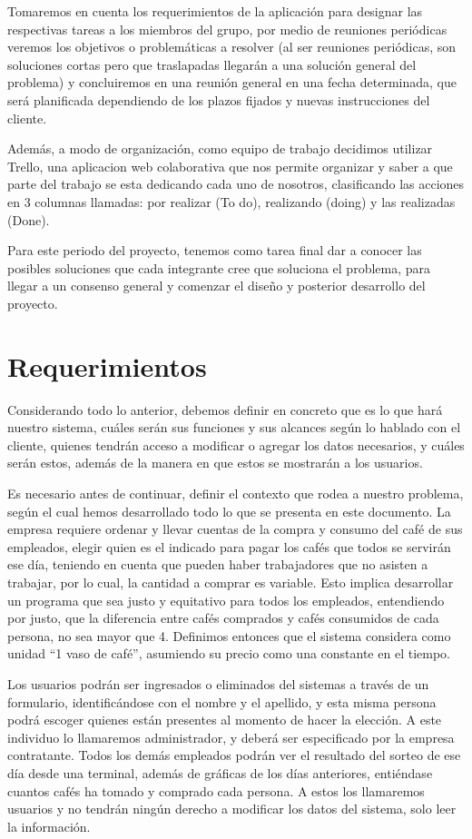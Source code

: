 \documentclass[twocolumn,11pts]{IEEEtran}
\begin{document}
Tomaremos en cuenta los requerimientos de la aplicación para designar las respectivas tareas a los miembros del grupo, por medio de reuniones periódicas veremos los objetivos o problemáticas a resolver (al ser reuniones periódicas, son soluciones cortas pero que traslapadas llegarán a una solución general del problema) y concluiremos en una reunión general en una fecha determinada, que será planificada dependiendo de los plazos fijados y nuevas instrucciones del cliente.

Además, a modo de organización, como equipo de trabajo decidimos utilizar Trello, una aplicacion web colaborativa que nos permite organizar y saber a que parte del trabajo se esta dedicando cada uno de nosotros, clasificando las acciones en 3 columnas llamadas: por realizar (To do), realizando (doing) y las realizadas (Done).

Para este periodo del proyecto, tenemos como tarea final dar a conocer las posibles soluciones que cada integrante cree que soluciona el problema, para llegar a un consenso general y comenzar el diseño y posterior desarrollo del proyecto.

\section{Requerimientos}

Considerando todo lo anterior, debemos definir en concreto que es lo que hará nuestro sistema, cuáles serán sus funciones y sus alcances según lo hablado con el cliente, quienes tendrán acceso a modificar o agregar los datos necesarios, y cuáles serán estos, además de la manera en que estos se mostrarán a los usuarios.

Es necesario antes de continuar, definir el contexto que rodea a nuestro problema, según el cual hemos desarrollado todo lo que se presenta en este documento. La empresa requiere ordenar y llevar cuentas de la compra y consumo del café de sus empleados, elegir quien es el indicado para pagar los cafés que todos se servirán ese día, teniendo en cuenta que pueden haber trabajadores que no asisten a trabajar, por lo cual, la cantidad a comprar es variable. Esto implica desarrollar un programa que sea justo y equitativo para todos los empleados, entendiendo por justo, que la diferencia entre cafés comprados y cafés consumidos de cada persona, no sea mayor que 4. Definimos entonces que el sistema considera como unidad “1 vaso de café”, asumiendo su precio como una constante en el tiempo.

Los usuarios podrán ser ingresados o eliminados del sistemas a través de un formulario, identificándose con el nombre y el apellido, y esta misma persona podrá escoger quienes están presentes al momento de hacer la elección. A este individuo lo llamaremos administrador, y deberá ser especificado por la empresa contratante. Todos los demás empleados podrán ver el resultado del sorteo de ese día desde una terminal, además de gráficas de los días anteriores, entiéndase cuantos cafés ha tomado y comprado cada persona. A estos los llamaremos usuarios y no tendrán ningún derecho a modificar los datos del sistema, solo leer la información.
\end{document}
